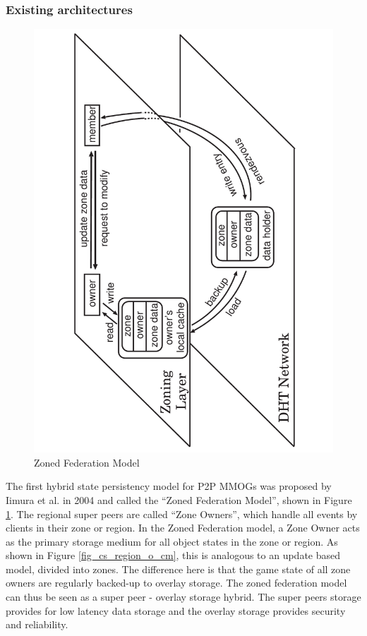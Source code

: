 \documentclass[10pt,a4paper,journal,cspaper,compsoc]{IEEEtran}
\begin{document}
\subsubsection{Existing architectures}

\begin{figure}[htbp]
 \centering
 \includegraphics[clip=true, viewport=2cm 0cm 19cm 30cm, angle=-90, width=\columnwidth]{zoned_federation_model}
 \caption{Zoned Federation Model \cite{zoned_federation}}
 \label{fig_zoned_federation_model}
\end{figure}
%
The first hybrid state persistency model for P2P MMOGs was proposed by Iimura et al. in 2004 \cite{zoned_federation} and called the ``Zoned
Federation Model'', shown in Figure \ref{fig_zoned_federation_model}. The regional super peers are called ``Zone Owners'', which handle all events by
clients in their zone or region. In the Zoned Federation model, a Zone Owner acts as the primary storage medium for all object states in the zone or
region. As shown in Figure \ref{fig_cs_region_o_cm}, this is analogous to an update based model, divided into zones. The difference here is that the
game state of all zone owners are regularly backed-up to overlay storage. The zoned federation model can thus be seen as a super peer - overlay
storage hybrid. The super peers storage provides for low latency data storage and the overlay storage provides security and reliability.
\end{document}

